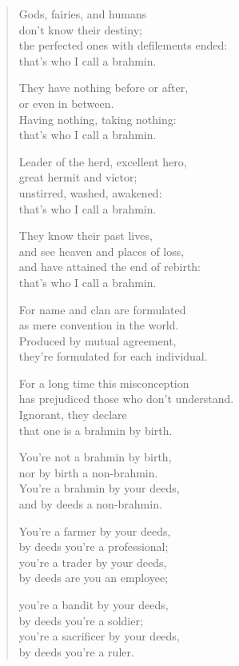 \documentclass[12pt,openany]{book}%
\begin{document}
\begin{verse}
Gods, fairies, and humans \\
don’t know their destiny; \\
the perfected ones with defilements ended: \\
that’s who I call a brahmin. 

They have nothing before or after, \\
or even in between. \\
Having nothing, taking nothing: \\
that’s who I call a brahmin. 

Leader of the herd, excellent hero, \\
great hermit and victor; \\
unstirred, washed, awakened: \\
that’s who I call a brahmin. 

They know their past lives, \\
and see heaven and places of loss, \\
and have attained the end of rebirth: \\
that’s who I call a brahmin. 

For name and clan are formulated \\
as mere convention in the world. \\
Produced by mutual agreement, \\
they’re formulated for each individual. 

For a long time this misconception \\
has prejudiced those who don’t understand. \\
Ignorant, they declare \\
that one is a brahmin by birth. 

You’re not a brahmin by birth, \\
nor by birth a non-brahmin. \\
You’re a brahmin by your deeds, \\
and by deeds a non-brahmin. 

You’re a farmer by your deeds, \\
by deeds you’re a professional; \\
you’re a trader by your deeds, \\
by deeds are you an employee; 

you’re a bandit by your deeds, \\
by deeds you’re a soldier; \\
you’re a sacrificer by your deeds, \\
by deeds you’re a ruler. 


\end{verse}
\end{document}
